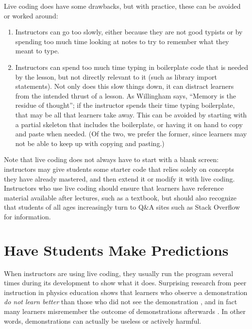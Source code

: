 Live coding does have some drawbacks, but with practice, these can be
avoided or worked around:

\begin{enumerate}

\item
  Instructors can go too slowly, either because they are not good
  typists or by spending too much time looking at notes to try to
  remember what they meant to type.

\item
  Instructors can spend too much time typing in boilerplate code that
  is needed by the lesson, but not directly relevant to it (such as
  library import statements). Not only does this slow things down, it
  can distract learners from the intended thrust of a lesson.  As
  Willingham \cite{Will2010} says, ``Memory is the residue of
  thought''; if the instructor spends their time typing boilerplate,
  that may be all that learners take away.  This can be avoided by
  starting with a partial skeleton that includes the boilerplate, or
  having it on hand to copy and paste when needed.  (Of the two, we
  prefer the former, since learners may not be able to keep up with
  copying and pasting.)

\end{enumerate}

Note that live coding does not always have to start with a blank
screen: instructors may give students some starter code that relies
solely on concepts they have already mastered, and then extend it or
modify it with live coding.  Instructors who use live coding should
ensure that learners have reference material available after lectures,
such as a textbook, but should also recognize that students of all
ages increasingly turn to Q\&A sites such as Stack Overflow for
information.

\section*{Have Students Make Predictions}

When instructors are using live coding, they usually run the program
several times during its development to show what it does.  Surprising
research from peer instruction in physics education shows that
learners who observe a demonstration \emph{do not learn better} than
those who did not see the demonstration \cite{Crou2004}, and in fact
many learners misremember the outcome of demonstrations afterwards
\cite{Mill2013}.  In other words, demonstrations can actually be
useless or actively harmful.

